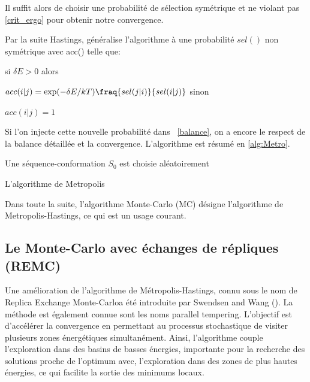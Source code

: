 Il suffit alors de choisir une probabilité de sélection symétrique et ne violant pas \ref{crit_ergo} pour obtenir notre convergence.


Par la suite Hastings, généralise l'algorithme à une probabilité $sel()$ non symétrique avec acc() telle que:


si
$\delta E >0$
alors

$acc(i|j) = \exp(- \delta E/kT) \fraq{sel(j|i)}{sel(i|j)}$
\label{eq:Hasting}
sinon

$acc(i|j)=1$


Si l'on injecte cette nouvelle probabilité dans ~\ref{balance}, on a encore le respect de la balance détaillée et la convergence. L'algorithme est résumé en \ref{alg:Metro}.


\begin{algorithm}
  \label{alg:Metro}
  Une séquence-conformation $S_0$ est choisie aléatoirement\;
\caption{L'algorithme de Metropolis}  
\end{algorithm}


Dans toute la suite, l'algorithme Monte-Carlo (MC) désigne l'algorithme de Metropolis-Hastings, ce qui est un usage courant.

\subsection{Le Monte-Carlo avec échanges de répliques (REMC)}
\label{REMC}

Une amélioration de l'algorithme de Métropolis-Hastings, connu sous le nom de \og Replica Exchange Monte-Carlo\fg a été introduite par Swendsen and Wang (\cite{Swendsen82}). La méthode est également connue sont les noms \og parallel tempering\fg. L'objectif est d'accélérer la convergence en permettant au processus stochastique de visiter plusieurs zones énergétiques simultanément. Ainsi, l'algorithme couple l'exploration dans des basins de basses énergies, importante pour la recherche des solutions proche de l'optimum avec, l'exploration dans des zones de plus hautes énergies, ce qui facilite la sortie des minimums locaux.

